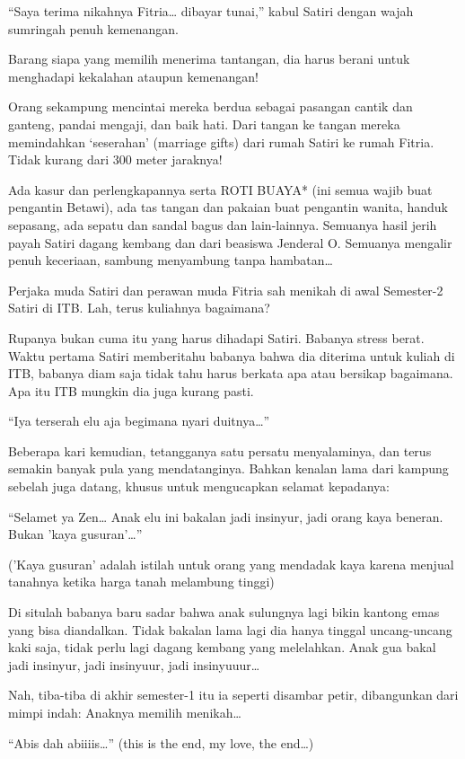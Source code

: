 “Saya terima nikahnya Fitria… dibayar tunai,” kabul Satiri dengan wajah sumringah penuh kemenangan.

Barang siapa yang memilih menerima tantangan, dia harus berani untuk menghadapi kekalahan ataupun kemenangan!

Orang sekampung mencintai mereka berdua sebagai pasangan cantik dan ganteng, pandai mengaji, dan baik hati. Dari tangan ke tangan mereka memindahkan ‘seserahan’ (marriage gifts) dari rumah Satiri ke rumah Fitria. Tidak kurang dari 300 meter jaraknya!

Ada kasur dan perlengkapannya serta ROTI BUAYA* (ini semua wajib buat pengantin Betawi), ada tas tangan dan pakaian buat pengantin wanita, handuk sepasang, ada sepatu dan sandal bagus dan lain-lainnya. Semuanya hasil jerih payah Satiri dagang kembang dan dari beasiswa Jenderal O. Semuanya mengalir penuh keceriaan, sambung menyambung tanpa hambatan…

Perjaka muda Satiri dan perawan muda Fitria sah menikah di awal Semester-2 Satiri di ITB. Lah, terus kuliahnya bagaimana?

Rupanya bukan cuma itu yang harus dihadapi Satiri. Babanya stress berat. Waktu pertama Satiri memberitahu babanya bahwa dia diterima untuk kuliah di ITB, babanya diam saja tidak tahu harus berkata apa atau bersikap bagaimana. Apa itu ITB mungkin dia juga kurang pasti.

“Iya terserah elu aja begimana nyari duitnya…”

Beberapa kari kemudian, tetangganya satu persatu menyalaminya, dan terus semakin banyak pula yang mendatanginya. Bahkan kenalan lama dari kampung sebelah juga datang, khusus untuk mengucapkan selamat kepadanya:

“Selamet ya Zen… Anak elu ini bakalan jadi insinyur, jadi orang kaya beneran. Bukan 'kaya gusuran'…”

('Kaya gusuran' adalah istilah untuk orang yang mendadak kaya karena menjual tanahnya ketika harga tanah melambung tinggi)

Di situlah babanya baru sadar bahwa anak sulungnya lagi bikin kantong emas yang bisa diandalkan. Tidak bakalan lama lagi dia hanya tinggal uncang-uncang kaki saja, tidak perlu lagi dagang kembang yang melelahkan. Anak gua bakal jadi insinyur, jadi insinyuur, jadi insinyuuur…

Nah, tiba-tiba di akhir semester-1 itu ia seperti disambar petir, dibangunkan dari mimpi indah: Anaknya memilih menikah…

“Abis dah abiiiis…” (this is the end, my love, the end…)

